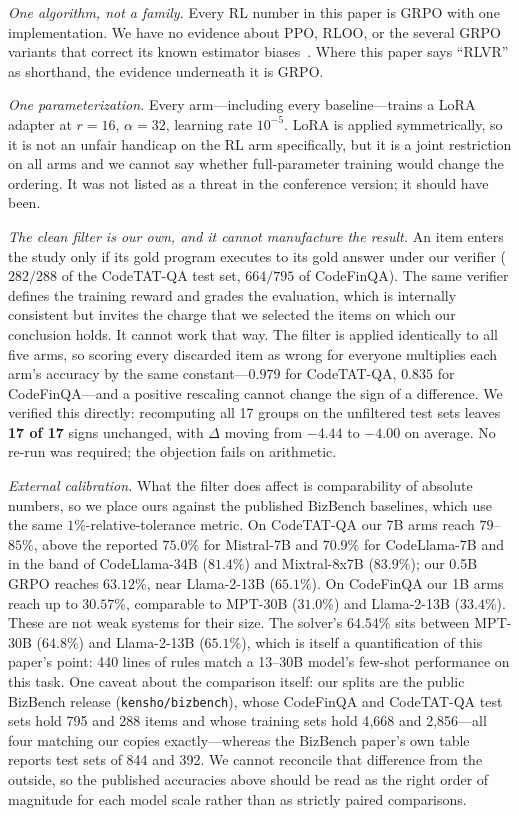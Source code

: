\emph{One algorithm, not a family.} Every RL number in this paper is GRPO with
one implementation. We have no evidence about PPO, RLOO, or the several GRPO
variants that correct its known estimator biases~\cite{drgrpo2025}. Where this
paper says ``RLVR'' as shorthand, the evidence underneath it is GRPO.

\emph{One parameterization.} Every arm---including every baseline---trains a
LoRA adapter at $r{=}16$, $\alpha{=}32$, learning rate $10^{-5}$. LoRA is
applied symmetrically, so it is not an unfair handicap on the RL arm
specifically, but it is a joint restriction on all arms and we cannot say
whether full-parameter training would change the ordering. It was not listed as
a threat in the conference version; it should have been.

\emph{The clean filter is our own, and it cannot manufacture the result.} An
item enters the study only if its gold program executes to its gold answer under
our verifier ($282/288$ of the CodeTAT-QA test set, $664/795$ of CodeFinQA). The
same verifier defines the training reward and grades the evaluation, which is
internally consistent but invites the charge that we selected the items on which
our conclusion holds. It cannot work that way. The filter is applied identically
to all five arms, so scoring every discarded item as wrong for everyone
multiplies each arm's accuracy by the same constant---$0.979$ for CodeTAT-QA,
$0.835$ for CodeFinQA---and a positive rescaling cannot change the sign of a
difference. We verified this directly: recomputing all 17 groups on the
unfiltered test sets leaves \textbf{17 of 17} signs unchanged, with $\Delta$
moving from $-4.44$ to $-4.00$ on average. No re-run was required; the objection
fails on arithmetic.

\emph{External calibration.} What the filter does affect is comparability of
absolute numbers, so we place ours against the published BizBench baselines,
which use the same $1\%$-relative-tolerance metric. On CodeTAT-QA our 7B arms
reach $79$--$85\%$, above the reported $75.0\%$ for Mistral-7B and $70.9\%$ for
CodeLlama-7B and in the band of CodeLlama-34B ($81.4\%$) and Mixtral-8x7B
($83.9\%$); our 0.5B GRPO reaches $63.12\%$, near Llama-2-13B ($65.1\%$). On
CodeFinQA our 1B arms reach up to $30.57\%$, comparable to MPT-30B ($31.0\%$)
and Llama-2-13B ($33.4\%$). These are not weak systems for their size. The
solver's $64.54\%$ sits between MPT-30B ($64.8\%$) and Llama-2-13B ($65.1\%$),
which is itself a quantification of this paper's point: 440 lines of rules match
a 13--30B model's few-shot performance on this task. One caveat about the
comparison itself: our splits are the public BizBench release
(\texttt{kensho/bizbench}), whose CodeFinQA and CodeTAT-QA test sets hold 795
and 288 items and whose training sets hold 4{,}668 and 2{,}856---all four
matching our copies exactly---whereas the BizBench paper's own table reports
test sets of 844 and 392. We cannot reconcile that difference from the outside,
so the published accuracies above should be read as the right order of magnitude
for each model scale rather than as strictly paired comparisons.


